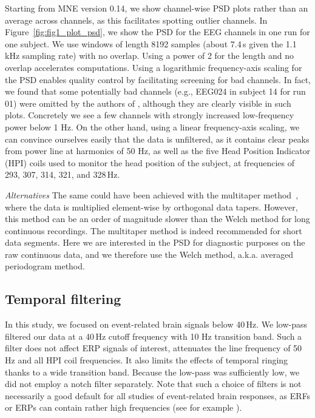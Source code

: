 Starting from MNE version 0.14, we show channel-wise PSD plots rather than an average across channels, as this facilitates spotting outlier channels. In Figure~\ref{fig:fig1_plot_psd}, we show the PSD for the EEG channels in one run for one subject. We use windows of length 8192 samples (about 7.4\,s given the 1.1\,kHz sampling rate) with no overlap. Using a power of 2 for the length and no overlap accelerates computations. Using a logarithmic frequency-axis scaling for the PSD enables quality control by facilitating screening for bad channels. In fact, we found that some potentially bad channels (e.g., EEG024 in subject 14 for run 01) were omitted by the authors of \citep{wakeman2015multi}, although they are clearly visible in such plots. Concretely we see a few channels with strongly increased low-frequency power below 1 Hz. On the other hand, using a linear frequency-axis scaling, we can convince ourselves easily that the data is unfiltered, as it contains clear peaks from power line at harmonics of 50 Hz, as well as the five Head Position Indicator (HPI) coils used to monitor the head position of the subject, at frequencies of 293, 307, 314, 321, and 328\,Hz.

\emph{Alternatives} The same could have been achieved with the multitaper method~\citep{percival1993spectral, slepian1978prolate}, where the data is multiplied element-wise by orthogonal data tapers. However, this method can be an order of magnitude slower than the Welch method for long continuous recordings. The multitaper method is indeed recommended for short data segments. Here we are interested in the PSD for diagnostic purposes on the raw continuous data, and we therefore use the Welch method, a.k.a. averaged periodogram method.

\subsection{Temporal filtering}

In this study, we focused on event-related brain signals below 40\,Hz. We low-pass filtered our data at a 40\,Hz cutoff frequency with 10 Hz transition band. Such a filter does not affect \ac{ERP} signals of interest, attenuates the line frequency of 50\,Hz and all HPI coil frequencies. It also limits the effects of temporal ringing thanks to a wide transition band. Because the low-pass was sufficiently low, we did not employ a notch filter separately. Note that such a choice of filters is not necessarily a good default for all studies of event-related brain responses, as ERFs or ERPs can contain rather high frequencies (see for example \citep{gotz-etal:15}).

